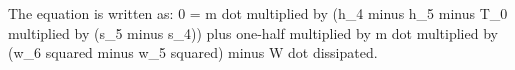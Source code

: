 The equation is written as:  
0 = m dot multiplied by (h_4 minus h_5 minus T_0 multiplied by (s_5 minus s_4)) plus one-half multiplied by m dot multiplied by (w_6 squared minus w_5 squared) minus W dot dissipated.